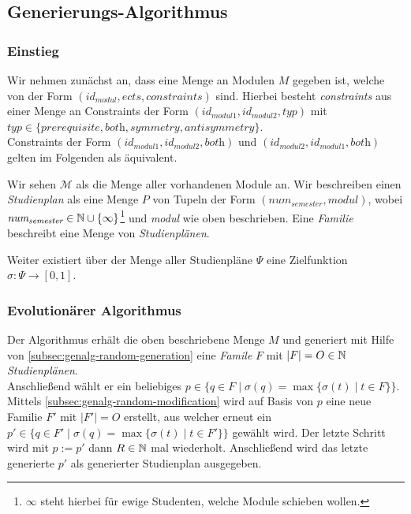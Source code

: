 \FloatBarrier
\subsection{Generierungs-Algorithmus}

\newcommand{\id}[1]{\textit{id}_{#1}}
\newenvironment{nstabbing}{
	\setlength{\topsep}{-\parskip}%
	\setlength{\partopsep}{0pt}%
	\tabbing
}{\endtabbing}

\subsubsection{Einstieg}
Wir nehmen zunächst an, dass eine Menge an Modulen $M$ gegeben ist, welche von der Form $(\id{\textit{modul}}, \textit{ects}, \textit{constraints})$ sind.
Hierbei besteht \textit{constraints} aus einer Menge an Constraints der Form $(\id{\textit{modul1}}, \id{\textit{modul2}}, \textit{typ})$ mit $\textit{typ} \in \{\textit{prerequisite}, \textit{both}, \textit{symmetry}, \textit{antisymmetry}\}$. \\
Constraints der Form $(\id{\textit{modul1}}, \id{\textit{modul2}}, \textit{both})$ und $(\id{\textit{modul2}}, \id{\textit{modul1}}, \textit{both})$ gelten im Folgenden als äquivalent.

Wir sehen $ \mathcal{M} $ als die Menge aller vorhandenen Module an.
Wir beschreiben einen \textit{Studienplan} als eine Menge $P$ von Tupeln der Form $(\textit{num}_{\textit{semester}}, \textit{modul})$, wobei $\textit{num}_{\textit{semester}} \in \mathbb{N} \cup \{\infty\}$\footnote{$\infty$ steht hierbei für ewige Studenten, welche Module schieben wollen.} und \textit{modul} wie oben beschrieben. Eine \textit{Familie} beschreibt eine Menge von \textit{Studienplänen}. 

Weiter existiert über der Menge aller Studienpläne $\Psi$ eine Zielfunktion  $\sigma : \Psi \to [0,1]$.

\subsubsection{Evolutionärer Algorithmus}
Der Algorithmus erhält die oben beschriebene Menge $M$ und generiert mit Hilfe von  \ref{subsec:genalg-random-generation} eine \textit{Famile} $F$ mit $|F| = O \in \mathbb{N}$ \textit{Studienplänen}.\\
Anschließend wählt er ein beliebiges $p \in \{q \in F \mid \sigma(q)=\max \{\sigma(t) \mid t \in F \} \}$.\\
Mittels \ref{subsec:genalg-random-modification} wird auf Basis von $p$ eine neue Familie $F'$ mit $|F'| = O$ erstellt, aus welcher erneut ein $p' \in \{q \in F' \mid \sigma(q) = \max \{\sigma(t) \mid t \in F' \} \}$ gewählt wird. Der letzte Schritt wird mit $p := p'$ dann $R \in \mathbb{N}$ mal wiederholt.
Anschließend wird das letzte generierte $p'$ als generierter Studienplan ausgegeben.

